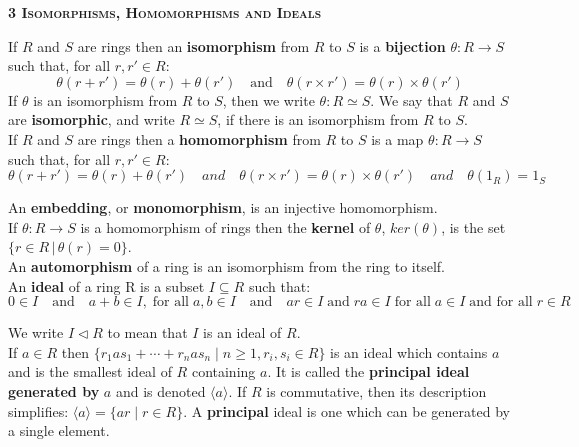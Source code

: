 \documentclass[a4paper]{article}
\begin{document}
\begin{framed}
	\begin{center}
		\textbf{\textsc{3 Isomorphisms, Homomorphisms and Ideals}}
	\end{center}
	If $R$ and $S$ are rings then an \textbf{isomorphism} from $R$ to $S$ is a \textbf{bijection} $\theta: R \rightarrow S$ such that, for all $r, r' \in R$:\\
	$$\theta(r + r') = \theta(r) + \theta(r') \quad \text{and} \quad \theta(r \times r') = \theta(r) \times \theta(r')$$
	If $\theta$ is an isomorphism from $R$ to $S$, then we write $\theta: R \simeq S$. We say that $R$ and $S$ are \textbf{isomorphic}, and write $R \simeq S$, if there is an isomorphism from $R$ to $S$.\\
	
	\noindent
	If $R$ and $S$ are rings then a \textbf{homomorphism} from $R$ to $S$ is a map $\theta: R \rightarrow S$ such that, for all $r, r' \in R$:
	$$\theta(r + r') = \theta(r) + \theta(r') \quad and \quad \theta(r \times r') = \theta(r) \times \theta(r') \quad and \quad \theta(1_R) = 1_S$$
	
	\noindent
	An \textbf{embedding}, or \textbf{monomorphism}, is an injective homomorphism.\\
	
	\noindent
	If $\theta: R \rightarrow S$ is a homomorphism of rings then the \textbf{kernel} of $\theta$, $ker(\theta)$, is the set $\{r \in R \, \vert \, \theta(r) = 0\}$.\\
	
	\noindent
	An \textbf{automorphism} of a ring is an isomorphism from the ring to itself.\\
	
	\noindent
	An \textbf{ideal} of a ring R is a subset $I \subseteq R$ such that:
	$$0 \in I \quad \text{and} \quad a + b \in I, \; \text{for all} \; a, b \in I \quad \text{and} \quad ar \in I \; \text{and} \; ra \in I \; \text{for all} \; a \in I \; \text{and for all} \; r \in R$$
	
	\noindent
	We write $I \triangleleft R$ to mean that $I$ is an ideal of $R$.\\
	
	\noindent
	If $a \in R$ then $\{r_1as_1 + \cdots + r_nas_n \; \vert \; n \geq 1, r_i, s_i \in R\}$ is an ideal which contains $a$ and is the smallest ideal of $R$ containing $a$. It is called the \textbf{principal ideal generated by} $a$ and is denoted $\langle a \rangle$. If $R$ is commutative, then its description simplifies: $\langle a \rangle = \{ar \; \vert \; r \in R\}$. A \textbf{principal} ideal is one which can be generated by a single element.\\
	

\end{framed}
\end{document}
